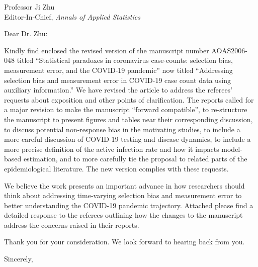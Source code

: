 \documentclass[11pt]{letter} %
\begin{document}

\begin{letter}{Professor Ji Zhu \\
    Editor-In-Chief, {\em Annals of Applied Statistics}
         }


\signature{Walter Dempsey\\
University of Michigan \\
Department of Biostatistics\\
M4057 SPH II \\
1415 Washington Heights \\
wdem@umich.edu} %


\date\today

\opening{Dear Dr. Zhu:}

Kindly find enclosed the revised version of the manuscript number AOAS2006-048 titled ``Statistical paradoxes in coronavirus case-counts: selection bias, measurement error, and the COVID-19 pandemic'' now titled ``Addressing selection bias and measurement error in COVID-19 case count data using auxiliary information.''  We have revised the article to address the referees’ requests about exposition and other points of clarification.  The reports called for a major revision to make the manuscript ``forward compatible'', to re-structure the manuscript to present figures and tables near their corresponding discussion, to discuss potential non-response bias in the motivating studies, to include a more careful discussion of COVID-19 testing and disease dynamics, to include a more precise definition of the active infection rate and how it impacts model-based estimation, and to more carefully tie the proposal to related parts of the epidemiological literature. The new version complies with these requests.

We believe the work presents an important advance in how researchers should think about addressing time-varying selection bias and measurement error to better understanding the COVID-19 pandemic trajectory. Attached please find a detailed response to the referees outlining how the changes to the manuscript address the concerns raised in their reports.

Thank you for your consideration. We look forward to hearing back from you.

\closing{Sincerely,}


\end{letter}
\end{document}
